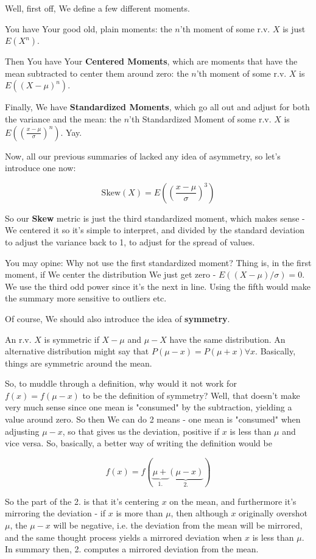 \documentclass{article}
\begin{document}
		Well, first off, We define a few different moments.
		
		You have Your good old, plain moments: the $n$'th moment of some r.v. $X$ is just $E(X^n)$.
		
		Then You have Your \textbf{Centered Moments}, which are moments that have the mean subtracted to center them around zero: the $n$'th moment of some r.v. $X$ is $E((X-\mu)^n)$.
		
		Finally, We have \textbf{Standardized Moments}, which go all out and adjust for both the variance and the mean: the $n$'th Standardized Moment of some r.v. $X$ is $E(\left(\frac{x-\mu}{\sigma} \right)^n)$. Yay.
		
		Now, all our previous summaries of lacked any idea of asymmetry, so let's introduce one now:
		
		\[ \text{Skew}(X) = E\left(\left(\frac{x-\mu}{\sigma}\right)^3\right) \]
		
		So our \textbf{Skew} metric is just the third standardized moment, which makes sense - We centered it so it's simple to interpret, and divided by the standard deviation to adjust the variance back to 1, to adjust for the spread of values.
		
		You may opine: Why not use the first standardized moment? Thing is, in the first moment, if We center the distribution We just get zero - $E((X-\mu)/\sigma) = 0$. We use the third odd power since it's the next in line. Using the fifth would make the summary more sensitive to outliers etc.
		
		Of course, We should also introduce the idea of \textbf{symmetry}.
		
		An r.v. $X$ is symmetric if $X-\mu$ and $\mu-X$ have the same distribution. An alternative distribution might say that $P(\mu - x) = P(\mu + x)\forall x$. Basically, things are symmetric around the mean.
		
		So, to muddle through a definition, why would it not work for $f(x) = f(\mu - x)$ to be the definition of symmetry? Well, that doesn't make very much sense since one mean is "consumed" by the subtraction, yielding a value around zero. So then We can do 2 means - one mean is "consumed" when adjusting $\mu - x$, so that gives us the deviation, positive if $x$ is less than $\mu$ and vice versa. So, basically, a better way of writing the definition would be
		
		\[ f(x) = f(\underbrace{\mu +}_{1.}\underbrace{(\mu - x)}_{2.}) \]
		
		So the part of the 2. is that it's centering $x$ on the mean, and furthermore it's mirroring the deviation - if $x$ is more than $\mu$, then although $x$ originally overshot $\mu$, the $\mu - x$ will be negative, i.e. the deviation from the mean will be mirrored, and the same thought process yields a mirrored deviation when $x$ is less than $\mu$. In summary then, 2. computes a mirrored deviation from the mean.
		
\end{document}
